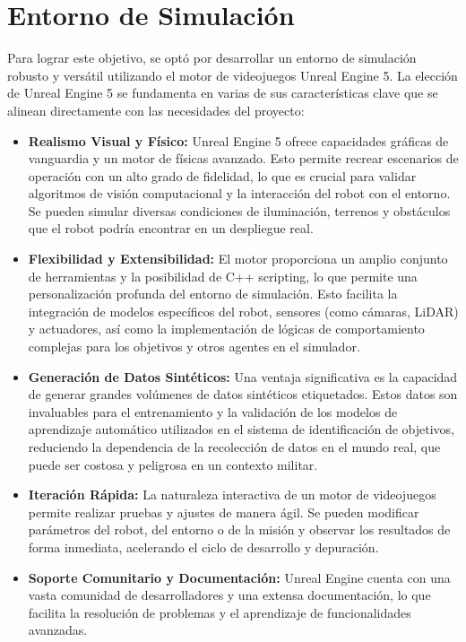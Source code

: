 

\section{Entorno de Simulación}

Para lograr este objetivo, se optó por desarrollar un entorno de simulación robusto y versátil utilizando el motor de videojuegos Unreal Engine 5. La elección de Unreal Engine 5 se fundamenta en varias de sus características clave que se alinean directamente con las necesidades del proyecto:

\begin{itemize}
    \item \textbf{Realismo Visual y Físico:} Unreal Engine 5 ofrece capacidades gráficas de vanguardia y un motor de físicas avanzado. Esto permite recrear escenarios de operación con un alto grado de fidelidad, lo que es crucial para validar algoritmos de visión computacional y la interacción del robot con el entorno. Se pueden simular diversas condiciones de iluminación, terrenos y obstáculos que el robot podría encontrar en un despliegue real.
    \item \textbf{Flexibilidad y Extensibilidad:} El motor proporciona un amplio conjunto de herramientas y la posibilidad de C++ scripting, lo que permite una personalización profunda del entorno de simulación. Esto facilita la integración de modelos específicos del robot, sensores (como cámaras, LiDAR) y actuadores, así como la implementación de lógicas de comportamiento complejas para los objetivos y otros agentes en el simulador.
    \item \textbf{Generación de Datos Sintéticos:} Una ventaja significativa es la capacidad de generar grandes volúmenes de datos sintéticos etiquetados. Estos datos son invaluables para el entrenamiento y la validación de los modelos de aprendizaje automático utilizados en el sistema de identificación de objetivos, reduciendo la dependencia de la recolección de datos en el mundo real, que puede ser costosa y peligrosa en un contexto militar.
    \item \textbf{Iteración Rápida:} La naturaleza interactiva de un motor de videojuegos permite realizar pruebas y ajustes de manera ágil. Se pueden modificar parámetros del robot, del entorno o de la misión y observar los resultados de forma inmediata, acelerando el ciclo de desarrollo y depuración.
    \item \textbf{Soporte Comunitario y Documentación:} Unreal Engine cuenta con una vasta comunidad de desarrolladores y una extensa documentación, lo que facilita la resolución de problemas y el aprendizaje de funcionalidades avanzadas.
\end{itemize}

